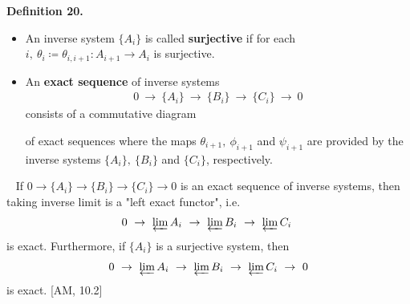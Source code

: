 \documentclass[12pt,a4paper,footinclude=true,headinclude=true]{scrbook} %
\newenvironment{proposition}[2][]
{\renewcommand\theinnercustomprop{#2}\innercustomprop[#1] 
\begin{mdframed}[backgroundcolor=gray!20]\ }
{\end{mdframed}\endinnercustomprop}
\newenvironment{definition}[2][Definition]
    { \begin{mdframed}[backgroundcolor=gray!20] \textbf{#1 #2.}\ }
    {  \end{mdframed}}
\begin{document}
\begin{definition}{20}
    \begin{itemize}
        \item An inverse system $\{A_i\}$ is called \textbf{surjective} if for each $i,\ \theta_i\coloneqq\theta_{i,i+1}:A_{i+1}\to A_i$ is surjective.
        \item An \textbf{exact sequence} of inverse systems
        \begin{align*}
            0\ \to\ \{A_i\}\ \to\ \{B_i\}\ \to\ \{C_i\}\ \to\ 0
        \end{align*}
        consists of a commutative diagram
        \begin{center}
    \end{center}
    of exact sequences where the maps $\theta_{i+1},\ \phi_{i+1}$ and $\psi_{i+1}$ are provided by the inverse systems $\{A_i\},\ \{B_i\}$ and $\{C_i\}$, respectively.
    \end{itemize}
\end{definition}
\newpage
\begin{proposition}{21}
    If $0\to\{A_i\}\to\{B_i\}\to\{C_i\}\to0$ is an exact sequence of inverse systems, then taking inverse limit is a "left exact functor", i.e.
    \begin{align*}
        0\ \to\ \varprojlim A_i\ \to\ \varprojlim B_i\  \to\ \varprojlim C_i\
    \end{align*}
    is exact. Furthermore, if $\{A_i\}$ is a surjective system, then
    \begin{align*}
        0\ \to\ \varprojlim A_i\ \to\ \varprojlim B_i\ \to\ \varprojlim C_i\ \to\ 0
    \end{align*}
    is exact. [AM, 10.2]
\end{proposition}
\end{document}

